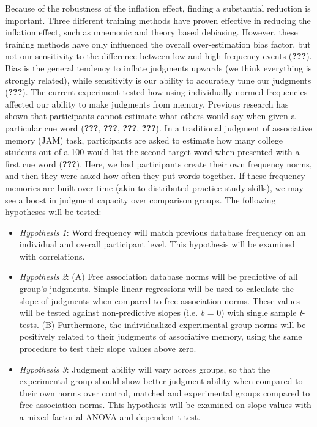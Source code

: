 \documentclass[english,man]{apa6}
\providecommand{\tightlist}{%
  \setlength{\itemsep}{0pt}\setlength{\parskip}{0pt}}
\theoremstyle{definition}
\theoremstyle{definition}
\theoremstyle{definition}
\theoremstyle{remark}
\begin{document}
Because of the robustness of the inflation effect, finding a substantial
reduction is important. Three different training methods have proven
effective in reducing the inflation effect, such as mnemonic and theory
based debiasing. However, these training methods have only influenced
the overall over-estimation bias factor, but not our sensitivity to the
difference between low and high frequency events ({\textbf{???}}). Bias
is the general tendency to inflate judgments upwards (we think
everything is strongly related), while sensitivity is our ability to
accurately tune our judgments ({\textbf{???}}). The current experiment
tested how using individually normed frequencies affected our ability to
make judgments from memory. Previous research has shown that
participants cannot estimate what others would say when given a
particular cue word ({\textbf{???}}, {\textbf{???}}, {\textbf{???}},
{\textbf{???}}). In a traditional judgment of associative memory (JAM)
task, participants are asked to estimate how many college students out
of a 100 would list the second target word when presented with a first
cue word ({\textbf{???}}). Here, we had participants create their own
frequency norms, and then they were asked how often they put words
together. If these frequency memories are built over time (akin to
distributed practice study skills), we may see a boost in judgment
capacity over comparison groups. The following hypotheses will be
tested:

\begin{itemize}
\tightlist
\item
  \emph{Hypothesis 1}: Word frequency will match previous database
  frequency on an individual and overall participant level. This
  hypothesis will be examined with correlations.
\item
  \emph{Hypothesis 2}: (A) Free association database norms will be
  predictive of all group's judgments. Simple linear regressions will be
  used to calculate the slope of judgments when compared to free
  association norms. These values will be tested against non-predictive
  slopes (i.e. \emph{b} = 0) with single sample \emph{t}-tests. (B)
  Furthermore, the individualized experimental group norms will be
  positively related to their judgments of associative memory, using the
  same procedure to test their slope values above zero.
\item
  \emph{Hypothesis 3}: Judgment ability will vary across groups, so that
  the experimental group should show better judgment ability when
  compared to their own norms over control, matched and experimental
  groups compared to free association norms. This hypothesis will be
  examined on slope values with a mixed factorial ANOVA and dependent
  t-test.
\end{itemize}
\end{document}
